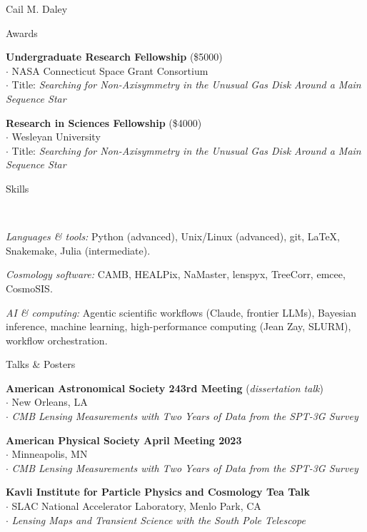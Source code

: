 \documentclass[11pt,a4paper]{article}
\begin{document}
\begin{cv}{Cail M. Daley}
\begin{cvlist}{Awards}
  \item[2015] \textbf{Undergraduate Research Fellowship} (\$5000) \\
    $\cdot$ NASA Connecticut Space Grant Consortium \\
    $\cdot$ Title: \textit{Searching for Non-Axisymmetry in the Unusual Gas Disk Around a Main Sequence Star}

  \item[2015] \textbf{Research in Sciences Fellowship} (\$4000)\\
    $\cdot$ Wesleyan University\\
    $\cdot$ Title: \textit{Searching for Non-Axisymmetry in the Unusual Gas Disk Around a Main Sequence Star}

  \end{cvlist}

  \begin{cvlist}{Skills}
  \item \
  \item \textit{Languages \& tools:} Python (advanced), Unix/Linux (advanced), git, \LaTeX, Snakemake, Julia (intermediate).
  \item \textit{Cosmology software:} CAMB, HEALPix, NaMaster, lenspyx, TreeCorr, emcee, CosmoSIS.
  \item \textit{AI \& computing:} Agentic scientific workflows (Claude, frontier LLMs), Bayesian inference, machine learning, high-performance computing (Jean Zay, SLURM), workflow orchestration.

  \end{cvlist}

  \newpage

  \settowidth{\cvlabelwidth}{\cvlabelfont 01/2024}%
  \begin{cvlist}{Talks \& Posters}
  \item [01/2024]
    \textbf{American Astronomical Society 243rd Meeting} (\textit{dissertation talk}) \\
    $\cdot$ New Orleans, LA \\
    $\cdot$ \textit{CMB Lensing Measurements with Two Years of Data from the SPT-3G Survey}

  \item [04/2023]
    \textbf{American Physical Society April Meeting 2023} \\
    $\cdot$ Minneapolis, MN \\
    $\cdot$ \textit{CMB Lensing Measurements with Two Years of Data from the SPT-3G Survey}

  \item [05/2022]
    \textbf{Kavli Institute for Particle Physics and Cosmology Tea Talk} \\
    $\cdot$ SLAC National Accelerator Laboratory, Menlo Park, CA \\
    $\cdot$ \textit{Lensing Maps and Transient Science with the South Pole Telescope}


\end{cvlist}
\end{cv}
\end{document}

